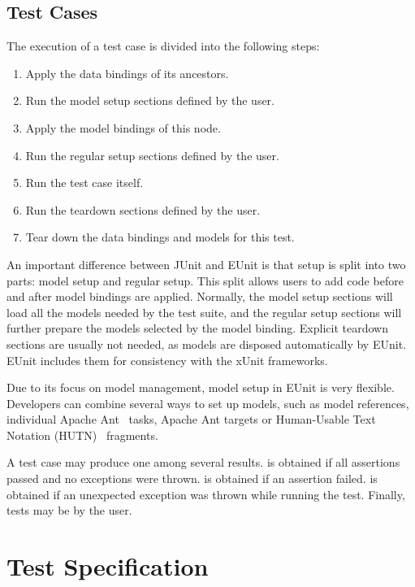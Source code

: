 \subsection{Test Cases}
\label{sec:eunit-test-cases}

The execution of a test case is divided into the following steps:
\begin{enumerate}
\item Apply the data bindings of its ancestors.
\item Run the model setup sections defined by the user.
\item Apply the model bindings of this node.
\item Run the regular setup sections defined by the user.
\item Run the test case itself.
\item Run the teardown sections defined by the user.
\item Tear down the data bindings and models for this test.
\end{enumerate}

An important difference between JUnit and EUnit is that setup is split into two parts: model setup and regular setup. This split allows users to add code before and after model bindings are applied. Normally, the model setup sections will load all the models needed by the test suite, and the regular setup sections will further prepare the models selected by the model binding. Explicit teardown sections are usually not needed, as models are disposed automatically by EUnit. EUnit includes them for consistency with the xUnit frameworks.

Due to its focus on model management, model setup in EUnit is very flexible. Developers can combine several ways to set up models, such as model references, individual Apache Ant~\cite{ANT} tasks, Apache Ant targets or Human-Usable Text Notation (HUTN)~\cite{HUTN} fragments.

A test case may produce one among several results.  is obtained if all assertions passed and no exceptions were thrown.  is obtained if an assertion failed.  is obtained if an unexpected exception was thrown while running the test. Finally, tests may be  by the user.

\section{Test Specification}
\label{sec:eunit-test-specification}

